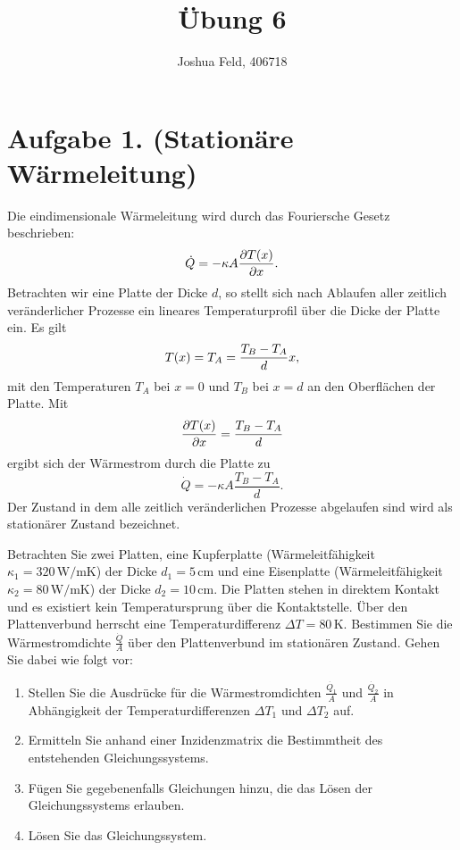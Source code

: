 \documentclass[german,12pt]{homework}
\title{Übung 6}
\author{Joshua Feld, 406718}
\institute{RWTH Aachen University\\Aachener Verfahrenstechnik}
\DeclarePairedDelimiter{\enbrace}{(}{)}
\newcommand{\sis}[1]{\,\si{#1}}
\begin{document}
    \maketitle

    \section*{Aufgabe 1. (Stationäre Wärmeleitung)}

    \begin{problem}
        Die eindimensionale Wärmeleitung wird durch das Fouriersche Gesetz
        beschrieben:
        \[\dot{Q} = -\kappa{A}\frac{\partial{T\enbrace*{x}}}{\partial{x}}.\]
        Betrachten wir eine Platte der Dicke \(d\), so stellt sich nach
        Ablaufen aller zeitlich veränderlicher Prozesse ein lineares
        Temperaturprofil über die Dicke der Platte ein. Es gilt
        \[T\enbrace*{x} = T_A = \frac{T_B - T_A}{d}x,\]
        mit den Temperaturen \(T_A\) bei \(x = 0\) und \(T_B\) bei \(x = d\) an
        den Oberflächen der Platte. Mit
        \[\frac{\partial{T\enbrace*{x}}}{\partial{x}} = \frac{T_B - T_A}{d}\]
        ergibt sich der Wärmestrom durch die Platte zu
        \[\dot{Q} = -\kappa{A}\frac{T_B - T_A}{d}.\]
        Der Zustand in dem alle zeitlich veränderlichen Prozesse abgelaufen
        sind wird als stationärer Zustand bezeichnet.

        Betrachten Sie zwei Platten, eine Kupferplatte (Wärmeleitfähigkeit
        \(\kappa_1 = 320\sis{\watt\per\meter\kelvin}\)) der Dicke \(d_1 =
        5\sis{\centi\meter}\) und eine Eisenplatte (Wärmeleitfähigkeit
        \(\kappa_2 = 80\sis{\watt\per\meter\kelvin}\)) der Dicke \(d_2 =
        10\sis{\centi\meter}\). Die Platten stehen in direktem Kontakt und es
        existiert kein Temperatursprung über die Kontaktstelle. Über den
        Plattenverbund herrscht eine Temperaturdifferenz \(\Delta{T} = 80
        \sis{\kelvin}\). Bestimmen Sie die Wärmestromdichte
        \(\frac{\dot{Q}}{A}\) über den Plattenverbund im stationären Zustand.
        Gehen Sie dabei wie folgt vor:
        \begin{enumerate}
            \item Stellen Sie die Ausdrücke für die Wärmestromdichten
            \(\frac{\dot{Q_1}}{A}\) und \(\frac{\dot{Q_2}}{A}\) in Abhängigkeit
            der Temperaturdifferenzen \(\Delta{T_1}\) und \(\Delta{T_2}\) auf.
            \item Ermitteln Sie anhand einer Inzidenzmatrix die Bestimmtheit
            des entstehenden Gleichungssystems.
            \item Fügen Sie gegebenenfalls Gleichungen hinzu, die das Lösen der
            Gleichungssystems erlauben.
            \item Lösen Sie das Gleichungssystem.
        \end{enumerate}
    \end{problem}
\end{document}
